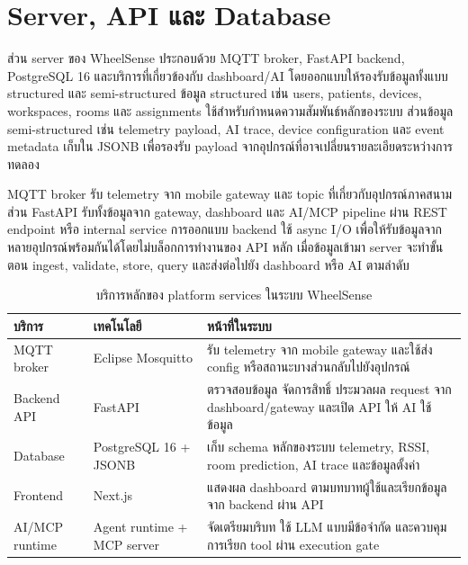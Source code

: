 \section{Server, API และ Database}
\label{sec:ch3_server}
ส่วน server ของ WheelSense ประกอบด้วย MQTT broker, FastAPI backend, PostgreSQL 16 และบริการที่เกี่ยวข้องกับ dashboard/AI โดยออกแบบให้รองรับข้อมูลทั้งแบบ structured และ semi-structured ข้อมูล structured เช่น users, patients, devices, workspaces, rooms และ assignments ใช้สำหรับกำหนดความสัมพันธ์หลักของระบบ ส่วนข้อมูล semi-structured เช่น telemetry payload, AI trace, device configuration และ event metadata เก็บใน JSONB เพื่อรองรับ payload จากอุปกรณ์ที่อาจเปลี่ยนรายละเอียดระหว่างการทดลอง

MQTT broker รับ telemetry จาก mobile gateway และ topic ที่เกี่ยวกับอุปกรณ์ภาคสนาม ส่วน FastAPI รับทั้งข้อมูลจาก gateway, dashboard และ AI/MCP pipeline ผ่าน REST endpoint หรือ internal service การออกแบบ backend ใช้ async I/O เพื่อให้รับข้อมูลจากหลายอุปกรณ์พร้อมกันได้โดยไม่บล็อกการทำงานของ API หลัก เมื่อข้อมูลเข้ามา server จะทำขั้นตอน ingest, validate, store, query และส่งต่อไปยัง dashboard หรือ AI ตามลำดับ

\begin{table}[H]
    \centering
    \caption{บริการหลักของ platform services ในระบบ WheelSense}
    \label{tab:ch3_services}
    \small
    \renewcommand{\arraystretch}{1.2}
    \begin{tabular}{|L{3.0cm}|L{3.2cm}|L{6.2cm}|}
        \hline
        \textbf{บริการ} & \textbf{เทคโนโลยี} & \textbf{หน้าที่ในระบบ} \\ \hline
        MQTT broker & Eclipse Mosquitto & รับ telemetry จาก mobile gateway และใช้ส่ง config หรือสถานะบางส่วนกลับไปยังอุปกรณ์ \\ \hline
        Backend API & FastAPI & ตรวจสอบข้อมูล จัดการสิทธิ์ ประมวลผล request จาก dashboard/gateway และเปิด API ให้ AI ใช้ข้อมูล \\ \hline
        Database & PostgreSQL 16 + JSONB & เก็บ schema หลักของระบบ telemetry, RSSI, room prediction, AI trace และข้อมูลตั้งค่า \\ \hline
        Frontend & Next.js & แสดงผล dashboard ตามบทบาทผู้ใช้และเรียกข้อมูลจาก backend ผ่าน API \\ \hline
        AI/MCP runtime & Agent runtime + MCP server & จัดเตรียมบริบท ใช้ LLM แบบมีข้อจำกัด และควบคุมการเรียก tool ผ่าน execution gate \\ \hline
    \end{tabular}
\end{table}

